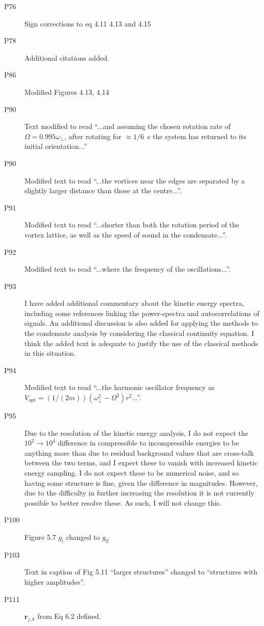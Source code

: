 \documentclass[paper=a4, fontsize=12pt]{scrartcl}
\begin{document}
\begin{description}
    \item [P76] Sign corrections to eq 4.11 4.13 and 4.15
    \item [P78] Additional citations added.
    \item [P86] Modified Figures 4.13, 4.14
    \item [P90] Text modified to read ``...and assuming the chosen rotation rate of $\Omega = 0.995\omega_\perp$, after rotating for
    $ \approx 1/6$\ s the system has returned to its initial orientation...''
    \item [P90] Modified text to read ``...the vortices near the edges are separated by a slightly larger distance than those at the centre...''.
    \item [P91] Modified text to read ``...shorter than both the rotation period of the vortex lattice, as well as the speed of sound in the condensate...''.
    \item [P92] Modified text to read ``...where the frequency of the oscillations...''.
    \item [P93] I have added additional commentary about the kinetic energy spectra, including some references linking the power-spectra and autocorrelations of signals. An additional discussion is also added for applying the methods to the condensate analysis by considering the classical continuity equation. I think the added text is adequate to justify the use of the classical methods in this situation.
    \item [P94] Modified text to read ``...the harmonic oscillator frequency  as $V_{\text{opt}} = (1/(2m))(\omega^2_\perp - \Omega^2)
    {r}^2$...''.
    \item [P95] Due to the resolution of the kinetic energy analysis, I do not expect the $10^2 \to 10^4$ difference in compressible to incompressible energies to be anything more than due to residual background values that are cross-talk between the two terms, and I expect these to vanish with increased kinetic energy sampling. I do not expect these to be numerical noise, and so having some structure is fine, given the difference in magnitudes. However, due to the difficulty in further increasing the resolution it is not currently possible to better resolve these. As such, I will not change this.
    \item [P100] Figure 5.7 $g_l$ changed to $g_{ll^\prime}$
    \item [P103] Text in caption of Fig 5.11 ``larger structures'' changed to ``structures with higher amplitudes''.
    \item [P111] $\mathbf{r}_{j,k}$ from Eq 6.2 defined.

\end{description}
\end{document}
